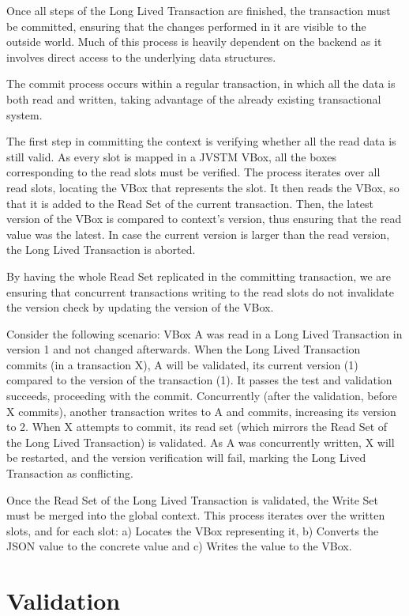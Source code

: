 Once all steps of the Long Lived Transaction are finished, the
transaction must be committed, ensuring that the changes performed in
it are visible to the outside world. Much of this process is heavily
dependent on the backend as it involves direct access to the
underlying data structures.

The commit process occurs within a regular transaction, in which all
the data is both read and written, taking advantage of the already
existing transactional system.

The first step in committing the context is verifying whether all the
read data is still valid. As every slot is mapped in a JVSTM VBox, all
the boxes corresponding to the read slots must be verified. The
process iterates over all read slots, locating the VBox that
represents the slot. It then reads the VBox, so that it is added to
the Read Set of the current transaction. Then, the latest version of
the VBox is compared to context's version, thus ensuring that the read
value was the latest. In case the current version is larger than the
read version, the Long Lived Transaction is aborted.

By having the whole Read Set replicated in the committing transaction,
we are ensuring that concurrent transactions writing to the read slots
do not invalidate the version check by updating the version of the
VBox. 

Consider the following scenario: VBox A was read in a Long Lived
Transaction in version 1 and not changed afterwards. When the Long
Lived Transaction commits (in a transaction X), A will be validated,
its current version (1) compared to the version of the transaction
(1). It passes the test and validation succeeds, proceeding with the
commit. Concurrently (after the validation, before X commits), another
transaction writes to A and commits, increasing its version to 2. When
X attempts to commit, its read set (which mirrors the Read Set of the
Long Lived Transaction) is validated. As A was concurrently written, X
will be restarted, and the version verification will fail, marking the
Long Lived Transaction as conflicting.

Once the Read Set of the Long Lived Transaction is validated, the
Write Set must be merged into the global context. This process
iterates over the written slots, and for each slot: a) Locates the
VBox representing it, b) Converts the JSON value to the concrete value
and c) Writes the value to the VBox.


\section{Validation}
\label{sec:validation}


